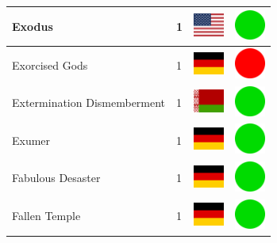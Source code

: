 \documentclass[12pt, a4paper, twoside]{report}
\begin{document}
\begin{center}
\begin{longtable}{|p{5cm}|p{2cm}|p{2cm}|p{2cm}|}
			Exodus & 1 & \includegraphics[width=1cm]{4x3/us} & \includegraphics[width=1cm]{likes/y} \\ \hline
			Exorcised Gods & 1 & \includegraphics[width=1cm]{4x3/de} & \includegraphics[width=1cm]{likes/n} \\ \hline
			Extermination Dismemberment & 1 & \includegraphics[width=1cm]{4x3/by} & \includegraphics[width=1cm]{likes/y} \\ \hline
			Exumer & 1 & \includegraphics[width=1cm]{4x3/de} & \includegraphics[width=1cm]{likes/y} \\ \hline
			Fabulous Desaster & 1 & \includegraphics[width=1cm]{4x3/de} & \includegraphics[width=1cm]{likes/y} \\ \hline
			Fallen Temple & 1 & \includegraphics[width=1cm]{4x3/de} & \includegraphics[width=1cm]{likes/y} \\ \hline

\end{longtable}
\end{center}
\end{document}
